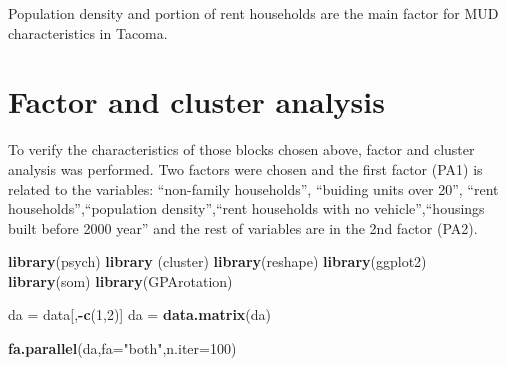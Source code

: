 \documentclass[]{article}
\newenvironment{Shaded}{\begin{snugshade}}{\end{snugshade}}
\newcommand{\KeywordTok}[1]{\textcolor[rgb]{0.13,0.29,0.53}{\textbf{#1}}}
\newcommand{\DataTypeTok}[1]{\textcolor[rgb]{0.13,0.29,0.53}{#1}}
\newcommand{\DecValTok}[1]{\textcolor[rgb]{0.00,0.00,0.81}{#1}}
\newcommand{\StringTok}[1]{\textcolor[rgb]{0.31,0.60,0.02}{#1}}
\newcommand{\OperatorTok}[1]{\textcolor[rgb]{0.81,0.36,0.00}{\textbf{#1}}}
\newcommand{\NormalTok}[1]{#1}
\begin{document}
\begin{table}[!h]

\caption{\label{tab:unnamed-chunk-3}Binomial logistic model \textsuperscript{*}}
\centering
{}
\end{table}


Population density and portion of rent households are the main factor
for MUD characteristics in Tacoma.

\section{Factor and cluster analysis}\label{factor-and-cluster-analysis}

To verify the characteristics of those blocks chosen above, factor and
cluster analysis was performed. Two factors were chosen and the first
factor (PA1) is related to the variables: ``non-family households'',
``buiding units over 20'', ``rent households'',``population
density'',``rent households with no vehicle'',``housings built before
2000 year'' and the rest of variables are in the 2nd factor (PA2).

\begin{Shaded}
\begin{Highlighting}[]
\KeywordTok{library}\NormalTok{(psych)}
\KeywordTok{library}\NormalTok{ (cluster)}
\KeywordTok{library}\NormalTok{(reshape)}
\KeywordTok{library}\NormalTok{(ggplot2)}
\KeywordTok{library}\NormalTok{(som)}
\KeywordTok{library}\NormalTok{(GPArotation)}

\NormalTok{da =}\StringTok{ }\NormalTok{data[,}\OperatorTok{-}\KeywordTok{c}\NormalTok{(}\DecValTok{1}\NormalTok{,}\DecValTok{2}\NormalTok{)]}
\NormalTok{da =}\StringTok{ }\KeywordTok{data.matrix}\NormalTok{(da)}

\KeywordTok{fa.parallel}\NormalTok{(da,}\DataTypeTok{fa=}\StringTok{"both"}\NormalTok{,}\DataTypeTok{n.iter=}\DecValTok{100}\NormalTok{)}
\end{Highlighting}
\end{Shaded}
\end{document}
